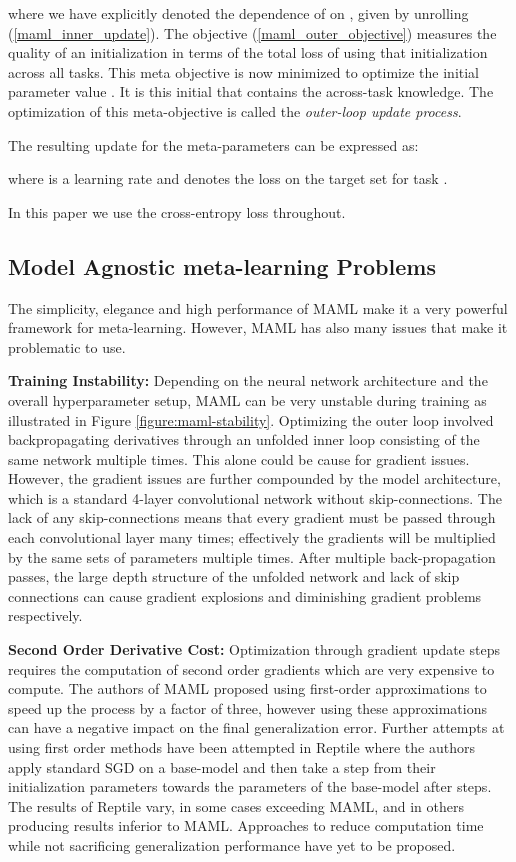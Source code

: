 \documentclass{article} \usepackage[dvipsnames]{xcolor}
\begin{document}
where we have explicitly denoted the dependence of  on , given by unrolling (\ref{maml_inner_update}). The objective (\ref{maml_outer_objective}) measures the quality of an initialization  in terms of the total loss of using that initialization across all tasks. This meta objective is now minimized to optimize the initial parameter value . It is this initial  that contains the across-task knowledge. The optimization of this meta-objective is called the \emph{outer-loop update process}.

The resulting update for the meta-parameters  can be expressed as:

where  is a learning rate and  denotes the loss on the target set for task .

In this paper we use the cross-entropy \citep{de2005tutorial,rubinstein1999cross} loss throughout.

\subsection{Model Agnostic meta-learning Problems}\label{section:maml-issues}
The simplicity, elegance and high performance of MAML make it a very powerful framework for meta-learning. However, MAML has also many issues that make it problematic to use. 

\textbf{Training Instability:} Depending on the neural network architecture and the overall hyperparameter setup, MAML can be very unstable during training as illustrated in Figure \ref{figure:maml-stability}. Optimizing the outer loop involved backpropagating derivatives through an unfolded inner loop consisting of the same network multiple times. This alone could be cause for gradient issues. However, the gradient issues are further compounded by the model architecture, which is a standard 4-layer convolutional network without skip-connections. The lack of any skip-connections means that every gradient must be passed through each convolutional layer many times; effectively the gradients will be multiplied by the same sets of parameters multiple times. After multiple back-propagation passes, the large depth structure of the unfolded network and lack of skip connections can cause gradient explosions and diminishing gradient problems respectively.

\textbf{Second Order Derivative Cost:} Optimization through gradient update steps requires the computation of second order gradients which are very expensive to compute. The authors of MAML proposed using first-order approximations to speed up the process by a factor of three, however using these approximations can have a negative impact on the final generalization error. Further attempts at using first order methods have been attempted in Reptile \citep{DBLP:journals/corr/abs-1803-02999} where the authors apply standard SGD on a base-model and then take a step from their initialization parameters towards the parameters of the base-model after  steps. The results of Reptile vary, in some cases exceeding MAML, and in others producing results inferior to MAML. Approaches to reduce computation time while not sacrificing generalization performance have yet to be proposed.
\end{document}
